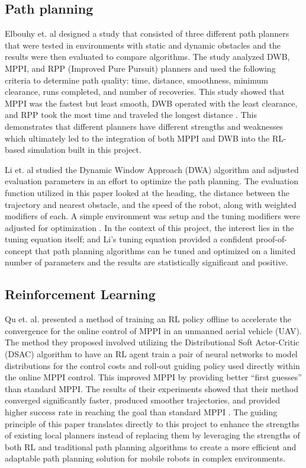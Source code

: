 \documentclass[conference]{IEEEtran}
\begin{document}
        \subsection{Path planning}
        Elbouhy et. al designed a study that consisted of three different path planners that were tested in environments with static and dynamic
        obstacles and the results were then evaluated to compare algorithms. The study analyzed DWB, MPPI, and RPP (Improved Pure Pursuit) planners
        and used the following criteria to determine path quality: time, distance, smoothness, minimum clearance, runs completed, and number of
        recoveries. This study showed that MPPI was the fastest but least smooth, DWB operated with the least clearance, and RPP took the most time
        and traveled the longest distance \cite{b1}. This demonstrates that different planners have different strengths and weaknesses which
        ultimately led to the integration of both MPPI and DWB into the RL-based simulation built in this project.
        
        Li et. al studied the Dynamic Window Approach (DWA) algorithm and adjusted evaluation parameters in an effort to optimize the path planning.
        The evaluation function utilized in this paper looked at the heading, the distance between the trajectory and nearest obstacle, and the speed
        of the robot, along with weighted modifiers of each. A simple environment was setup and the tuning modifiers were adjusted for optimization
        \cite{b2}. In the context of this project, the interest lies in the tuning equation itself; and Li's tuning equation provided a 
        confident proof-of-concept that path planning algorithms can be tuned and optimized on a limited number of parameters and the results are
        statistically significant and positive.

        \subsection{Reinforcement Learning}
        Qu et. al. presented a method of training an RL policy offline to accelerate the convergence for the online control of MPPI in an unmanned
        aerial vehicle (UAV). The method they proposed involved utilizing the Distributional Soft Actor-Critic (DSAC) algorithm to have an RL agent
        train a pair of neural networks to model distributions for the control costs and roll-out guiding policy used directly within the online MPPI
        control. This improved MPPI by providing better ``first guesses'' than standard MPPI. The results of their experiments showed that their
        method converged significantly faster, produced smoother trajectories, and provided higher success rate in reaching the goal than standard
        MPPI \cite{b3}. The guiding principle of this paper translates directly to this project to enhance the strengths of existing local planners
        instead of replacing them by leveraging the strengths of both RL and traditional path planning algorithms to create a more efficient and 
        adaptable path planning solution for mobile robots in complex environments.
\end{document}

